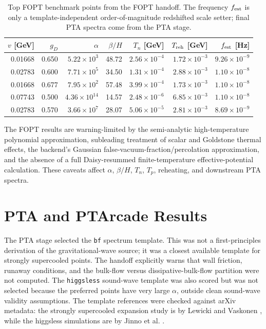 \documentclass[11pt]{article}
\newcommand{\gD}{g_D}
\begin{document}
\begin{table}[htbp]
\centering
\small
\begin{tabular}{rrrrrrr}
\toprule
\(v\) [GeV] & \(\gD\) & \(\alpha\) & \(\beta/H\) & \(T_n\) [GeV] & \(T_{\rm reh}\) [GeV] & \(f_{\rm est}\) [Hz] \\
\midrule
0.01668 & 0.650 & \(5.22{\times}10^3\) & 48.72 & \(2.56{\times}10^{-4}\) & \(1.72{\times}10^{-3}\) & \(9.26{\times}10^{-9}\) \\
0.02783 & 0.600 & \(7.71{\times}10^5\) & 34.50 & \(1.31{\times}10^{-4}\) & \(2.88{\times}10^{-3}\) & \(1.10{\times}10^{-8}\) \\
0.01668 & 0.677 & \(7.95{\times}10^2\) & 57.48 & \(3.99{\times}10^{-4}\) & \(1.73{\times}10^{-3}\) & \(1.10{\times}10^{-8}\) \\
0.07743 & 0.500 & \(4.36{\times}10^{14}\) & 14.57 & \(2.48{\times}10^{-6}\) & \(6.85{\times}10^{-3}\) & \(1.10{\times}10^{-8}\) \\
0.02783 & 0.570 & \(3.66{\times}10^7\) & 28.07 & \(5.06{\times}10^{-5}\) & \(2.81{\times}10^{-3}\) & \(8.69{\times}10^{-9}\) \\
\bottomrule
\end{tabular}
\caption{Top FOPT benchmark points from the FOPT handoff. The frequency \(f_{\rm est}\) is only a template-independent order-of-magnitude redshifted scale setter; final PTA spectra come from the PTA stage.}
\label{tab:foptbest}
\end{table}

The FOPT results are warning-limited by the semi-analytic high-temperature polynomial approximation, subleading treatment of scalar and Goldstone thermal effects, the backend's Gaussian false-vacuum-fraction/percolation approximation, and the absence of a full Daisy-resummed finite-temperature effective-potential calculation. These caveats affect \(\alpha\), \(\beta/H\), \(T_n\), \(T_p\), reheating, and downstream PTA spectra.

\section{PTA and PTArcade Results}

The PTA stage selected the \texttt{bf} spectrum template. This was not a first-principles derivation of the gravitational-wave source; it was a closest available template for strongly supercooled points. The handoff explicitly warns that wall friction, runaway conditions, and the bulk-flow versus dissipative-bulk-flow partition were not computed. The \texttt{higgsless} sound-wave template was also scored but was not selected because the preferred points have very large \(\alpha\), outside clean sound-wave validity assumptions. The template references were checked against arXiv metadata: the strongly supercooled expansion study is by Lewicki and Vaskonen \cite{Lewicki:2025}, while the higgsless simulations are by Jinno et al. \cite{Jinno:2022}.
\end{document}
